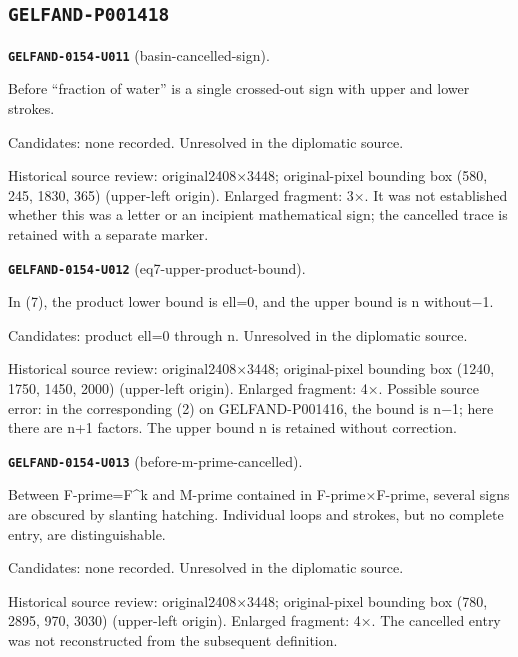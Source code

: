\subsection*{\texttt{GELFAND-P001418}}
\par\noindent\leavevmode{}\label{GELFAND-0154-U011}\textbf{\texttt{GELFAND-0154-U011}} (basin-cancelled-sign).\nopagebreak[4]\par
Before “fraction of water” is a single crossed-out sign with upper and lower strokes.\par
Candidates: none recorded. Unresolved in the diplomatic source.\par
Historical source review: original2408×3448; original-pixel bounding box (580, 245, 1830, 365) (upper-left origin). Enlarged fragment: 3×. It was not established whether this was a letter or an incipient mathematical sign; the cancelled trace is retained with a separate marker.\par\medskip
\par\noindent\leavevmode{}\label{GELFAND-0154-U012}\textbf{\texttt{GELFAND-0154-U012}} (eq7-upper-product-bound).\nopagebreak[4]\par
In (7), the product lower bound is ell=0, and the upper bound is n without−1.\par
Candidates: product ell=0 through n. Unresolved in the diplomatic source.\par
Historical source review: original2408×3448; original-pixel bounding box (1240, 1750, 1450, 2000) (upper-left origin). Enlarged fragment: 4×. Possible source error: in the corresponding (2) on GELFAND-P001416, the bound is n−1; here there are n+1 factors. The upper bound n is retained without correction.\par\medskip
\par\noindent\leavevmode{}\label{GELFAND-0154-U013}\textbf{\texttt{GELFAND-0154-U013}} (before-m-prime-cancelled).\nopagebreak[4]\par
Between F-prime=F\textasciicircum{}k and M-prime contained in F-prime×F-prime, several signs are obscured by slanting hatching. Individual loops and strokes, but no complete entry, are distinguishable.\par
Candidates: none recorded. Unresolved in the diplomatic source.\par
Historical source review: original2408×3448; original-pixel bounding box (780, 2895, 970, 3030) (upper-left origin). Enlarged fragment: 4×. The cancelled entry was not reconstructed from the subsequent definition.\par\medskip
